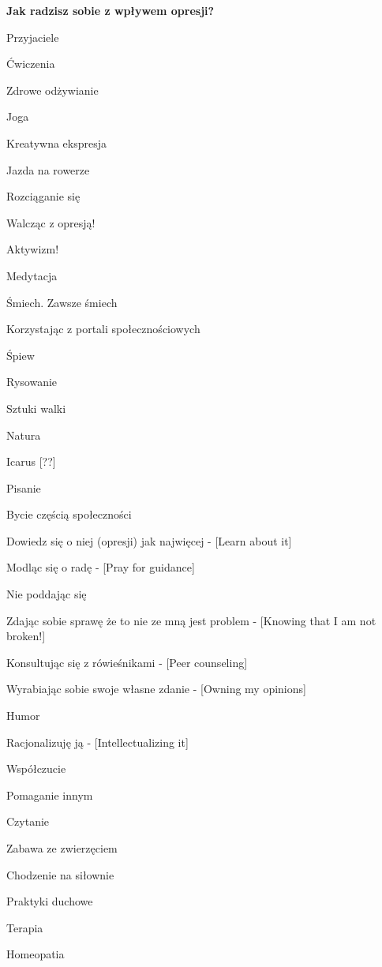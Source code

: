 \noindent\textcolor{ProcessBlue}{\textbf{\Large{Jak radzisz sobie z wpływem opresji?}}}\\
\begin{multicols}{2}
\begin{checkboxlist}
\item Przyjaciele
\item Ćwiczenia
\item Zdrowe odżywianie
\item Joga
\item Kreatywna ekspresja
\item Jazda na rowerze
\item Rozciąganie się
\item Walcząc z opresją!
\item Aktywizm!
\item Medytacja
\item Śmiech. Zawsze śmiech
\item Korzystając z portali społecznościowych
\item Śpiew
\item Rysowanie
\item Sztuki walki
\item Natura
\item Icarus [??]
\item Pisanie
\item Bycie częścią społeczności
\item Dowiedz się o niej (opresji) jak najwięcej - [Learn about it]
\item Modląc się o radę - [Pray for guidance]
\item Nie poddając się
\item Zdając sobie sprawę że to nie ze mną jest problem - [Knowing that I am not broken!]
\item Konsultując się z rówieśnikami - [Peer counseling]
\item Wyrabiając sobie swoje własne zdanie - [Owning my opinions]
\item Humor
\item Racjonalizuję ją - [Intellectualizing it]
\item Współczucie
\item Pomaganie innym
\item Czytanie
\item Zabawa ze zwierzęciem
\item Chodzenie na siłownie
\item Praktyki duchowe
\item Terapia
\item Homeopatia

\end{checkboxlist}
\end{multicols}
